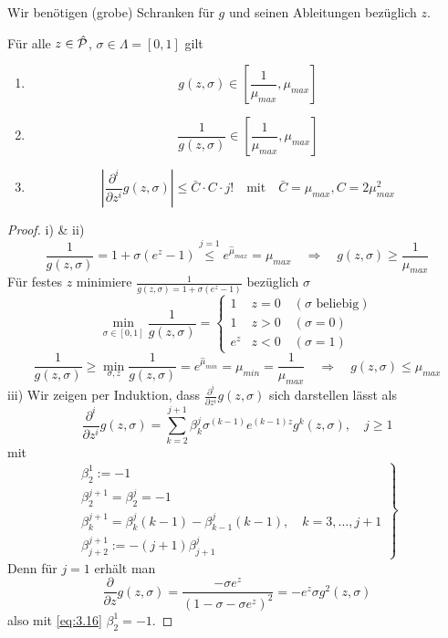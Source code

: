 Wir benötigen (grobe) Schranken für $g$ und seinen Ableitungen bezüglich $z$.

\begin{lemma}
\label{3.40}
	Für alle $z \in \hat{\mathcal{P}}$, $\sigma \in \Lambda = [0,1]$ gilt
	\begin{enumerate}
		\item
			\[
				g(z,\sigma) \in \left[ \frac{1}{\mu_{max}}, \mu_{max} \right]
			\]
		\item
			\[
				\frac{1}{g(z,\sigma)} \in \left[ \frac{1}{\mu_{max}}, \mu_{max} \right]
			\]
		\item
			\[
				\left| \frac{\partial^i}{\partial z^i} g(z,\sigma) \right| \leq \bar C \cdot C \cdot j! \quad \text{mit} \quad \bar C = \mu_{max}, C = 2\mu_{max}^2
			\]
	\end{enumerate}

	\begin{proof}
		i) \& ii)
		\[
			\frac{1}{g(z,\sigma)} = 1 + \sigma (e^z-1) \stackrel{j=1}{\leq} e^{\hat\mu_{max}} = \mu_{max} \quad \Rightarrow \quad g(z,\sigma) \geq \frac{1}{\mu_{max}}
		\]
		Für festes $z$ minimiere $\frac{1}{g(z,\sigma) = 1+\sigma(e^z-1)}$ bezüglich $\sigma$
		\[
			\min_{\sigma \in [0,1]} \frac{1}{g(z,\sigma)} = \begin{cases}
				1 & z = 0 \quad (\sigma \text{ beliebig})\\
				1 & z > 0 \quad (\sigma = 0)\\
				e^z & z < 0 \quad (\sigma = 1)
			\end{cases}
		\]
		\[
			\frac{1}{g(z,\sigma)} \geq \min_{\sigma,z} \frac{1}{g(z,\sigma)} = e^{\hat\mu_{min}} = \mu_{min} = \frac{1}{\mu_{max}} \quad \Rightarrow \quad g(z,\sigma) \leq \mu_{max}
		\]
		iii) Wir zeigen per Induktion, dass $\frac{\partial^i}{\partial z^i} g(z,\sigma)$ sich darstellen lässt als
		\begin{equation}
			\frac{\partial^i}{\partial z^i} g(z,\sigma) = \sum_{k=2}^{j+1} \beta_k^j \sigma^{(k-1)} e^{(k-1)z} g^k(z,\sigma), \quad j \geq 1 \label{eq:3.16}
		\end{equation}
		mit
		\begin{equation}
			\left.
			\begin{array}{l}
				\beta_2^1 := -1\\
				\beta_2^{j+1} = \beta_2^j = -1\\
				\beta_k^{j+1} = \beta_k^j (k-1) - \beta_{k-1}^j(k-1), \quad k = 3,\dots,j+1\\
				\beta_{j+2}^{j+1} := -(j+1) \beta_{j+1}^j
			\end{array}
			\right\} \label{eq:3.17}
		\end{equation}
		Denn für $j = 1$ erhält man
		\[
			\frac{\partial}{\partial z} g(z,\sigma) = \frac{-\sigma e^z}{(1-\sigma-\sigma e^z)^2} = -e^z \sigma g^2(z,\sigma)
		\]
		also mit \eqref{eq:3.16} $\beta_2^1 = -1$.

\end{proof}
\end{lemma}
